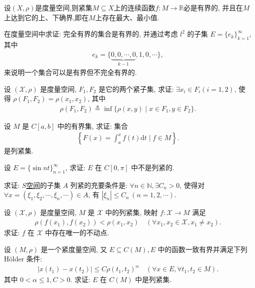 \documentclass[../../main.tex]{subfiles}%
\begin{document}
\begin{proposition}\label{proposition:紧集上的连续函数必有最值}
设$(X,\rho)$是度量空间,则紧集$M\subseteq X$上的连续函数$f:M\to \mathbb{R}$必是有界的, 并且在$M$上达到它的上、下确界,即在$M$上存在最大、最小值.
\end{proposition}

\begin{example}
在度量空间中求证: 完全有界的集合是有界的, 并通过考虑 $l^2$ 的子集 $E = \{e_k\}_{k=1}^\infty$, 其中
\begin{align*}
e_k = \{\underbrace{0,0,\cdots,0}_{k-1},1,0,\cdots\},
\end{align*}
来说明一个集合可以是有界但不完全有界的.
\end{example}

\begin{example}
设 $(\mathscr{X},\rho)$ 是度量空间, $F_1,F_2$ 是它的两个紧子集, 求证: $\exists x_i \in F_i(i=1,2)$, 使得 $\rho(F_1,F_2) = \rho(x_1,x_2)$, 其中
\begin{align*}
\rho(F_1,F_2) \triangleq \inf\limits\{\rho(x,y) \mid x \in F_1, y \in F_2\}.
\end{align*}
\end{example}

\begin{example}
设 $M$ 是 $C[a,b]$ 中的有界集, 求证: 集合
\begin{align*}
\left\{F(x) = \int_a^x f(t)\mathrm{d}t \mid f \in M\right\}.
\end{align*}
是列紧集.
\end{example}

\begin{example}
设 $E = \{\sin nt\}_{n=1}^\infty$, 求证: $E$ 在 $C[0,\pi]$ 中不是列紧的.
\end{example}

\begin{example}
求证: \hyperref[proposition:空间S是完备度量空间]{$S$空间}的子集 $A$ 列紧的充要条件是: $\forall n \in \mathbb{N}, \exists C_n > 0$, 使得对 $\forall x = (\xi_1,\xi_2,\cdots,\xi_n,\cdots) \in A$, 有 $|\xi_n| \leqslant C_n\ (n=1,2,\cdots)$.
\end{example}

\begin{example}
设 $(\mathscr{X},\rho)$ 是度量空间, $M$ 是 $\mathscr{X}$ 中的列紧集, 映射 $f: \mathscr{X} \to M$ 满足
\begin{align*}
\rho(f(x_1),f(x_2)) < \rho(x_1,x_2) \quad (\forall x_1,x_2 \in \mathscr{X}, x_1 \neq x_2).
\end{align*}
求证: $f$ 在 $\mathscr{X}$ 中存在唯一的不动点.
\end{example}

\begin{example}
设 $(M,\rho)$ 是一个紧度量空间, 又 $E \subseteq C(M), E$ 中的函数一致有界并满足下列 Hölder 条件:
\begin{align*}
|x(t_1) - x(t_2)| \leqslant C\rho(t_1,t_2)^\alpha \quad (\forall x \in E, \forall t_1,t_2 \in M).
\end{align*}
其中 $0 < \alpha \leqslant 1, C > 0$. 求证: $E$ 在 $C(M)$ 中是列紧集.
\end{example}
\end{document}
